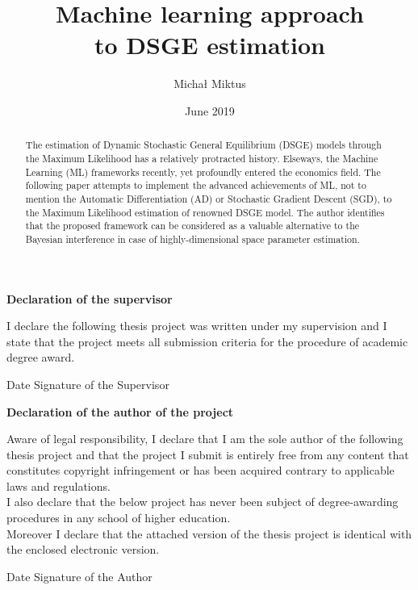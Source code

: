 \documentclass{pracamgr}
\author{Michał Miktus}
\title{Machine learning approach \\
to DSGE estimation}
\date{June 2019}
\numberwithin{equation}{section}
\begin{document}
\maketitle

 \begin{titlepage}
    
    \large
    \null
    \vfill
    
  \textbf{\Large Declaration of the supervisor} 
      \vspace{3mm}
      
   I declare the following thesis project was written under my supervision and I state that the project meets all submission criteria for the procedure of academic degree award.\\
   \vspace{5mm}
   
   Date \hfill Signature of the Supervisor
   
   \vspace{2cm}
   \textbf{\Large Declaration of the author of the project}
    \vspace{3mm}
    
   Aware of legal responsibility, I declare that I am the sole author of the following thesis project and that the project I submit is entirely free from any content that constitutes copyright infringement or has been acquired contrary to applicable laws and regulations.\\
   
   I also declare that the below project has never been subject of degree-awarding procedures in any school of higher education.\\

   Moreover I declare that the attached version of the thesis project is identical with the enclosed electronic version.\\
   \vspace{5mm}
   
   Date  \hfill Signature of the Author 
    \vspace{3cm}
 
\end{titlepage}
    
\begin{abstract}
The estimation of Dynamic Stochastic General Equilibrium (DSGE) models through the Maximum Likelihood has a relatively protracted history. Elseways, the Machine Learning (ML) frameworks recently, yet profoundly entered the economics field. The following paper attempts to implement the advanced achievements of ML, not to mention the Automatic Differentiation (AD) or Stochastic Gradient Descent (SGD), to the Maximum Likelihood estimation of renowned \citet{smets2003estimated} DSGE model. The author identifies that the proposed framework can be considered as a valuable alternative to the Bayesian interference in case of highly-dimensional space parameter estimation.
\end{abstract}
\end{document}
